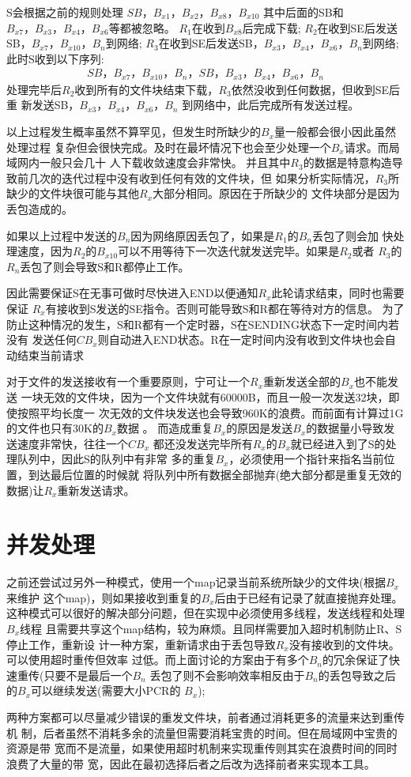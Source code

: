 S会根据之前的规则处理
$SB，B_{x1}，B_{x2}，B_{x8}，B_{x10}$
其中后面的SB和$B_{x7}，B_{x3}，B_{x4}，B_{x6}$等都被忽略。
$R_1$在收到$B_{x8}$后完成下载;
$R_2$在收到SE后发送SB，$B_{x7}，B_{x10}，B_n$到网络;
$R_3$在收到SE后发送SB，$B_{x3}，B_{x4}，B_{x6}，B_n$到网络;\\
此时S收到以下序列:
\begin{align*}
	SB，B_{x7}，B_{x10}，B_n，SB，B_{x3}，B_{x4}，B_{x6}，B_n
\end{align*}
处理完毕后$R_2$收到所有的文件块结束下载，$R_3$依然没收到任何数据，但收到SE后重
新发送SB，$B_{x3}，B_{x4}，B_{x6}，B_n$ 到网络中，此后完成所有发送过程。

以上过程发生概率虽然不算罕见，但发生时所缺少的$B_x$量一般都会很小因此虽然处理过程
复杂但会很快完成。及时在最坏情况下也会至少处理一个$B_x$请求。而局域网内一般只会几十
人下载收敛速度会非常快。
并且其中$R_3$的数据是特意构造导致前几次的迭代过程中没有收到任何有效的文件块，但
如果分析实际情况，$R_3$所缺少的文件块很可能与其他$R_x$大部分相同。原因在于所缺少的
文件块部分是因为丢包造成的。

如果以上过程中发送的$B_n$因为网络原因丢包了，如果是$R_1$的$B_n$丢包了则会加
快处理速度，因为$R_2$的$B_{x10}$可以不用等待下一次迭代就发送完毕。如果是$R_2$或者
$R_3$的$R_n$丢包了则会导致S和R都停止工作。

因此需要保证S在无事可做时尽快进入END以便通知$R_x$此轮请求结束，同时也需要保证
$R_x$有接收到S发送的SE指令。否则可能导致S和R都在等待对方的信息。
为了防止这种情况的发生，S和R都有一个定时器，S在SENDING状态下一定时间内若没有
发送任何$CB_x$则自动进入END状态。R在一定时间内没有收到文件块也会自动结束当前请求

对于文件的发送接收有一个重要原则，宁可让一个$R_x$重新发送全部的$B_x$也不能发送
一块无效的文件块，因为一个文件块就有60000B，而且一般一次发送32块，即使按照平均长度一
次无效的文件块发送也会导致960K的浪费。而前面有计算过1G的文件也只有30K的$B_x$数据
。 而造成重复$B_x$的原因是发送$B_x$的数据量小导致发送速度非常快，往往一个$CB_x$
都还没发送完毕所有$R_x$的$B_x$就已经进入到了S的处理队列中，因此S的队列中有非常
多的重复$B_x$，必须使用一个指针来指名当前位置，到达最后位置的时候就
将队列中所有数据全部抛弃(绝大部分都是重复无效的数据)让$R_x$重新发送请求。

\section{并发处理}
之前还尝试过另外一种模式，使用一个map记录当前系统所缺少的文件块(根据$B_x$来维护
这个map)，则如果接收到重复的$B_x$后由于已经有记录了就直接抛弃处理。
这种模式可以很好的解决部分问题，但在实现中必须使用多线程，发送线程和处理$B_x$线程
且需要共享这个map结构，较为麻烦。且同样需要加入超时机制防止R、S停止工作，重新设
计一种方案，重新请求由于丢包导致$R_x$没有接收到的文件块。可以使用超时重传但效率
过低。而上面讨论的方案由于有多个$B_n$的冗余保证了快速重传(只要不是最后一个$B_n$
丢包了则不会影响效率相反由于$B_n$的丢包导致之后的$B_x$可以继续发送(需要大小PCR的
$B_x$); 

两种方案都可以尽量减少错误的重发文件块，前者通过消耗更多的流量来达到重传机
制，后者虽然不消耗多余的流量但需要消耗宝贵的时间。但在局域网中宝贵的资源是带
宽而不是流量，如果使用超时机制来实现重传则其实在浪费时间的同时浪费了大量的带
宽，因此在最初选择后者之后改为选择前者来实现本工具。
